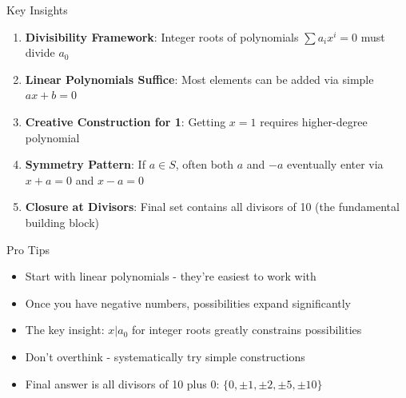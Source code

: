 \documentclass[12pt]{article}
\begin{document}
\begin{highlightbox}{Key Insights}
\begin{enumerate}
    \item \textbf{Divisibility Framework}: Integer roots of polynomials $\sum a_i x^i = 0$ must divide $a_0$
    \item \textbf{Linear Polynomials Suffice}: Most elements can be added via simple $ax + b = 0$
    \item \textbf{Creative Construction for 1}: Getting $x = 1$ requires higher-degree polynomial
    \item \textbf{Symmetry Pattern}: If $a \in S$, often both $a$ and $-a$ eventually enter via $x + a = 0$ and $x - a = 0$
    \item \textbf{Closure at Divisors}: Final set contains all divisors of 10 (the fundamental building block)
\end{enumerate}
\end{highlightbox}

\begin{highlightbox}{Pro Tips}
\begin{itemize}
    \item Start with linear polynomials - they're easiest to work with
    \item Once you have negative numbers, possibilities expand significantly
    \item The key insight: $x | a_0$ for integer roots greatly constrains possibilities
    \item Don't overthink - systematically try simple constructions
    \item Final answer is all divisors of 10 plus 0: $\{0, \pm 1, \pm 2, \pm 5, \pm 10\}$
\end{itemize}
\end{highlightbox}
\end{document}
